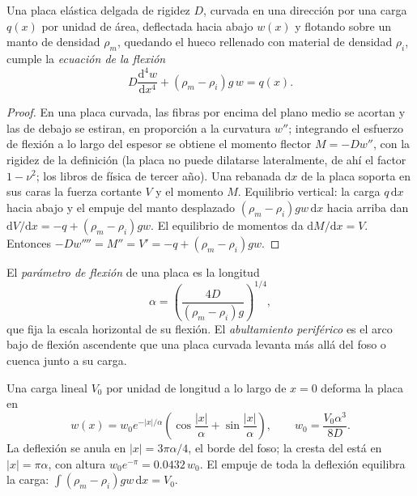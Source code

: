 \begin{theorem}\label{thm:b3:gravity-geodesy:plate}
Una placa elástica delgada de rigidez $D$, curvada en una dirección por una carga $q(x)$
por unidad de área, deflectada hacia abajo $w(x)$ y flotando sobre un manto de densidad
$\rho_m$, quedando el hueco rellenado con material de densidad $\rho_i$, cumple la
\emph{ecuación de la flexión}
\[
  D\frac{\mathrm d^4w}{\mathrm dx^4} + (\rho_m - \rho_i)g\,w = q(x) .
\]
\end{theorem}

\begin{proof}
En una placa curvada, las fibras por encima del plano medio se acortan y las de debajo se estiran,
en proporción a la curvatura $w''$; integrando el esfuerzo de flexión
a lo largo del espesor se obtiene el momento flector $M = -Dw''$, con la
rigidez de la definición (la placa no puede dilatarse lateralmente, de ahí el factor
$1 - \nu^2$; los libros de física de tercer año). Una rebanada $\mathrm dx$ de la placa
soporta en sus caras la fuerza cortante $V$ y el momento $M$. Equilibrio vertical:
la carga $q\,\mathrm dx$ hacia abajo y el empuje del manto desplazado
$(\rho_m - \rho_i)gw\,\mathrm dx$ hacia arriba dan $\mathrm dV/\mathrm dx = -q +
(\rho_m - \rho_i)gw$. El equilibrio de momentos da $\mathrm dM/\mathrm dx = V$.
Entonces $-Dw'''' = M'' = V' = -q + (\rho_m - \rho_i)gw$.
\end{proof}

\begin{definition}\label{def:b3:gravity-geodesy:alpha}
El \emph{parámetro de flexión} de una placa es la
longitud
\[
  \alpha = \left(\frac{4D}{(\rho_m - \rho_i)g}\right)^{1/4},
\]
que fija la escala horizontal de su flexión. El \emph{abultamiento periférico}
es el arco bajo de flexión ascendente que una placa curvada levanta más allá del foso o
cuenca junto a su carga.
\end{definition}

\begin{proposition}\label{prop:b3:gravity-geodesy:line}
Una carga lineal $V_0$ por unidad de longitud a lo largo de $x = 0$ deforma la placa en
\[
  w(x) = w_0e^{-|x|/\alpha}\left(\cos\frac{|x|}{\alpha} + \sin\frac{|x|}{\alpha}\right),
  \qquad w_0 = \frac{V_0\alpha^3}{8D} .
\]
La deflexión se anula en $|x| = 3\pi\alpha/4$, el borde del foso; la
cresta del  está en $|x| = \pi\alpha$, con altura $w_0e^{-\pi} =
\num{0.0432}\,w_0$. El empuje de toda la deflexión equilibra la carga:
$\int(\rho_m - \rho_i)gw\,\mathrm dx = V_0$.
\end{proposition}

